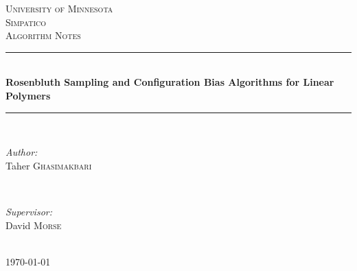 \documentclass[12pt]{article} %
\begin{document}

\begin{titlepage}

\newcommand{\HRule}{\rule{\linewidth}{0.5mm}} %

\center %

\textsc{\LARGE University of Minnesota}\\[1.5cm] %
\textsc{\Large Simpatico}\\[0.5cm] %
\textsc{\large Algorithm Notes}\\[0.5cm] %

\HRule \\[0.4cm]
{ \huge \bfseries Rosenbluth Sampling and Configuration Bias Algorithms for Linear Polymers}\\[0.4cm] %
\HRule \\[1.5cm]

\begin{minipage}{0.4\textwidth}
\begin{flushleft} \large
\emph{Author:}\\
Taher \textsc{Ghasimakbari} %
\end{flushleft}
\end{minipage}
~
\begin{minipage}{0.4\textwidth}
\begin{flushright} \large
\emph{Supervisor:} \\
David \textsc{Morse} %
\end{flushright}
\end{minipage}\\[4cm]

{\large \today}\\[3cm] %


\vfill %

\end{titlepage}
\end{document}
